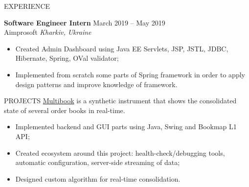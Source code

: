 \documentclass{resume} %
\begin{document}
\begin{rSection}{EXPERIENCE}

\textbf{Software Engineer Intern} \hfill March 2019 -- May 2019\\
Aimprosoft \hfill \textit{Kharkiv, Ukraine}
 \begin{itemize}[topsep=2pt, itemsep=7pt,parsep=-5pt]
     \item Created Admin Dashboard using Java EE Servlets, JSP, JSTL, JDBC, Hibernate, Spring, OVal validator;
     \item Implemented from scratch some parts of Spring framework in order to apply design patterns and improve knowledge of framework.
 \end{itemize}

\end{rSection} 

\begin{rSection}{PROJECTS}
    \href{https://bookmap.com/knowledgebase/docs/Addons-Multibook}{Multibook} {is a synthetic instrument that shows the consolidated state of several order books in real-time.  }
    \begin{itemize}[topsep=2pt, itemsep=7pt,parsep=-5pt]
        \item Implemented backend and GUI parts using Java, Swing and Bookmap L1 API;
        \item Created ecosystem around this project: health-check/debugging tools, automatic configuration, server-side streaming of data;
        \item Designed custom algorithm for real-time consolidation.
    \end{itemize} 
\end{rSection} 
\end{document}
